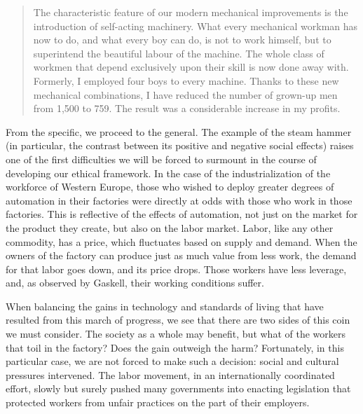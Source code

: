 \begin{quotation}\small
  The characteristic feature of our modern mechanical 
  improvements is the introduction of self-acting machinery. What every 
  mechanical workman has now to do, and what every boy can do, is not to 
  work himself, but to superintend the beautiful labour of the machine. 
  The whole class of workmen that depend exclusively upon their skill is 
  now done away with. Formerly, I employed four boys to every machine. 
  Thanks to these new mechanical combinations, I have reduced the number 
  of grown-up men from 1,500 to 759. The result was a considerable 
  increase in my profits.\cite{marx1867strife}
\end{quotation}

From the specific, we proceed to the general.  The example of the steam 
hammer (in particular, the contrast between its positive and negative 
social effects) raises one of the first difficulties we will be forced to 
surmount in the course of developing our ethical framework.  
In the case of the industrialization of the workforce of Western 
Europe, those who wished to deploy greater 
degrees of automation in their factories were directly at odds 
with those who work in those factories.  This is reflective of 
the effects of automation, not just on the market for the product they 
create, but also on the labor market.  Labor, like any other commodity, 
has a price, which fluctuates based on supply and demand.  When the 
owners of the factory can produce just as much value from less work, 
the demand for that labor goes down, and its price drops.  Those 
workers have less leverage, and, as observed by Gaskell, their working 
conditions suffer.

When balancing the gains in technology and standards of living that 
have resulted from this march of progress, we see that there are two 
sides of this coin we must consider.  The society as a whole may 
benefit, but what of the workers that toil in the factory?  Does the 
gain outweigh the harm?  Fortunately, in this particular case, we are not 
forced to make such a decision: social and cultural pressures intervened.  
The labor movement, in an internationally 
coordinated effort, slowly but surely pushed many governments 
into enacting legislation that protected workers from unfair practices 
on the part of their employers.

